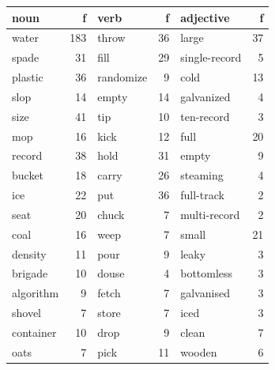 \documentclass[a4paper,landscape,headrule,footrule,xetex]{foils}
\begin{document}
\begin{small}
  \vspace*{0.5ex}\begin{tabular}{lrlrlr}
    noun       & f    & verb       & f   & adjective     & f   \\   \hline
    water      & 183  & throw      & 36  & large         & 37  \\ 
    spade      & 31   & fill        & 29  & single-record & 5   \\ 
    plastic    & 36   & randomize  & 9   & cold          & 13  \\ 
    slop       & 14   & empty      & 14  & galvanized    & 4   \\ 
    size       & 41   & tip        & 10  & ten-record    & 3   \\ 
    mop        & 16   & kick       & 12  & full          & 20  \\ 
    record     & 38   & hold       & 31  & empty         & 9   \\ 
    bucket     & 18   & carry      & 26  & steaming      & 4   \\ 
    ice        & 22   & put        & 36  & full-track    & 2   \\ 
    seat       & 20   & chuck      & 7   & multi-record  & 2   \\ 
    coal       & 16   & weep       & 7   & small         & 21  \\ 
    density    & 11   & pour       & 9   & leaky         & 3   \\ 
    brigade    & 10   & douse      & 4   & bottomless    & 3   \\ 
    algorithm  & 9    & fetch      & 7   & galvanised    & 3   \\ 
    shovel     & 7    & store      & 7   & iced          & 3   \\ 
    container  & 10   & drop       & 9   & clean         & 7   \\ 
    oats       & 7    & pick       & 11  & wooden        & 6   \\ 
  \end{tabular}
\end{small}\vspace*{-1.0ex}
\end{document}
